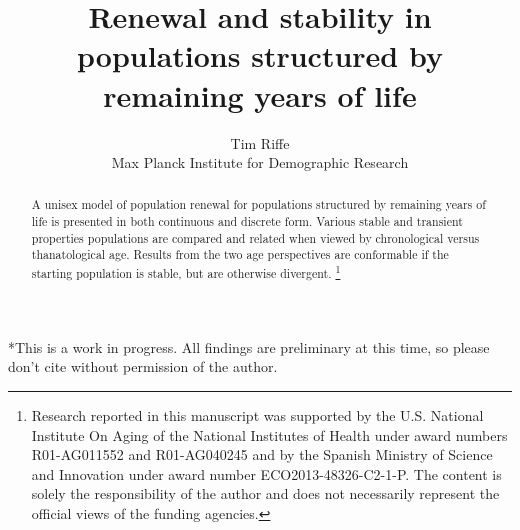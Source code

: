 \documentclass{article}
\newcommand\ackn[1]{%
  \begingroup
  \renewcommand\thefootnote{}\footnote{#1}%
  \addtocounter{footnote}{-1}%
  \endgroup
}
\begin{document}
\title{Renewal and stability in populations structured by remaining
years of life}
\author{Tim Riffe \\ Max Planck Institute for Demographic Research}
\maketitle

\begin{abstract}
A unisex model of population renewal for populations structured by
remaining years of life is presented in both continuous and discrete form.
Various stable and transient properties populations are compared and related when viewed
by chronological versus thanatological age. Results from the two age perspectives are conformable if the starting
population is stable, but are otherwise divergent.\ackn{Research reported in this manuscript
was supported by the U.S.
National Institute On Aging of the National Institutes of Health under award numbers R01-AG011552 and R01-AG040245 and by the Spanish Ministry of Science and Innovation under award
number ECO2013-48326-C2-1-P. The content is solely the responsibility of the
author and does not necessarily represent the official views of the funding
agencies.}
\end{abstract}

*This is a work in progress. All findings are preliminary at this time, so
please don't cite without permission of the author.
\vspace{2em}

\onehalfspacing
\end{document}
